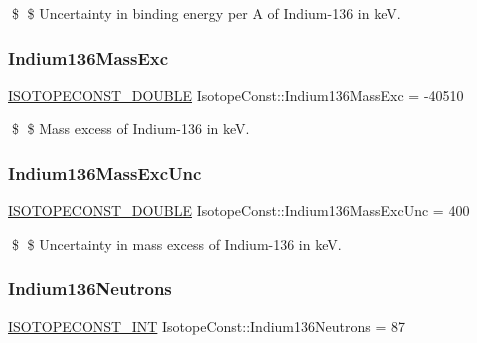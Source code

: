 \$ \$ Uncertainty in binding energy per A of Indium-\/136 in keV. \mbox{\label{group___isotope_const-_indium-_in136_gab5542a04abdf0f323057d2d50a414bac}} 
\subsubsection{\texorpdfstring{Indium136\+Mass\+Exc}{Indium136MassExc}}
{\footnotesize\ttfamily \mbox{\hyperlink{group___isotope_const-_macros_ga8f45a7272ce02c0b4c65c44636ed719a}{I\+S\+O\+T\+O\+P\+E\+C\+O\+N\+S\+T\+\_\+\+D\+O\+U\+B\+LE}} Isotope\+Const\+::\+Indium136\+Mass\+Exc = -\/40510}

\$ \$ Mass excess of Indium-\/136 in keV. \mbox{\label{group___isotope_const-_indium-_in136_gaa9d65f0eafdd80075453eef1167d2973}} 
\subsubsection{\texorpdfstring{Indium136\+Mass\+Exc\+Unc}{Indium136MassExcUnc}}
{\footnotesize\ttfamily \mbox{\hyperlink{group___isotope_const-_macros_ga8f45a7272ce02c0b4c65c44636ed719a}{I\+S\+O\+T\+O\+P\+E\+C\+O\+N\+S\+T\+\_\+\+D\+O\+U\+B\+LE}} Isotope\+Const\+::\+Indium136\+Mass\+Exc\+Unc = 400}

\$ \$ Uncertainty in mass excess of Indium-\/136 in keV. \mbox{\label{group___isotope_const-_indium-_in136_gaae00d2fa56df0d9adaa161379e2c3666}} 
\subsubsection{\texorpdfstring{Indium136\+Neutrons}{Indium136Neutrons}}
{\footnotesize\ttfamily \mbox{\hyperlink{group___isotope_const-_macros_ga5f18360b3e99483a35c32d789e62621c}{I\+S\+O\+T\+O\+P\+E\+C\+O\+N\+S\+T\+\_\+\+I\+NT}} Isotope\+Const\+::\+Indium136\+Neutrons = 87}

